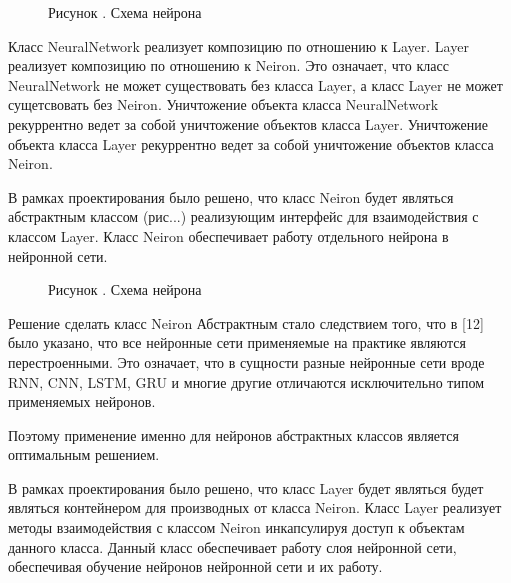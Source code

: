 {\begin{figure}[htb]
	\centering
	\def\svgwidth{\textwidth}
	
	\caption*{\gostFont Рисунок \thechaptercntr .\theimagecntr \spc {--} Схема нейрона}
	\label{fig:ris1}
\end{figure} 

\addtocounter{imagecntr}{1}

\par \redline  Класс NeuralNetwork реализует композицию по отношению к Layer. Layer реализует композицию по отношению к Neiron. Это означает, что класс NeuralNetwork не может существовать без класса Layer, а класс Layer не может сущетсвовать без Neiron. Уничтожение объекта класса NeuralNetwork рекуррентно ведет за собой уничтожение объектов класса Layer.  Уничтожение объекта класса Layer рекуррентно ведет за собой уничтожение объектов класса Neiron.

\par \redline  В рамках проектирования было решено, что класс Neiron будет являться абстрактным классом (рис.\thechaptercntr .\theimagecntr.) реализующим интерфейс для взаимодействия с классом Layer. Класс Neiron обеспечивает работу отдельного нейрона в нейронной сети.

\begin{figure}[htb]
	\centering
	\def\svgwidth{\textwidth}
	
	\caption*{\gostFont Рисунок \thechaptercntr .\theimagecntr \spc {--} Схема нейрона}
	\label{fig:ris1}
\end{figure} 

\addtocounter{imagecntr}{1}

\par \redline  Решение сделать класс Neiron Абстрактным стало следствием того, что в [12] было указано, что все нейронные сети применяемые на практике являются перестроенными. Это означает, что в сущности разные нейронные сети вроде RNN, CNN, LSTM, GRU и многие другие отличаются исключительно типом применяемых нейронов.

\par \redline Поэтому применение именно для нейронов абстрактных классов является оптимальным решением.  

\par \redline В рамках проектирования было решено, что класс Layer будет являться будет являться контейнером для производных от класса Neiron. Класс Layer реализует методы взаимодействия с классом Neiron инкапсулируя доступ к объектам данного класса. Данный класс обеспечивает работу слоя нейронной сети, обеспечивая обучение нейронов нейронной сети и их работу. 

}
